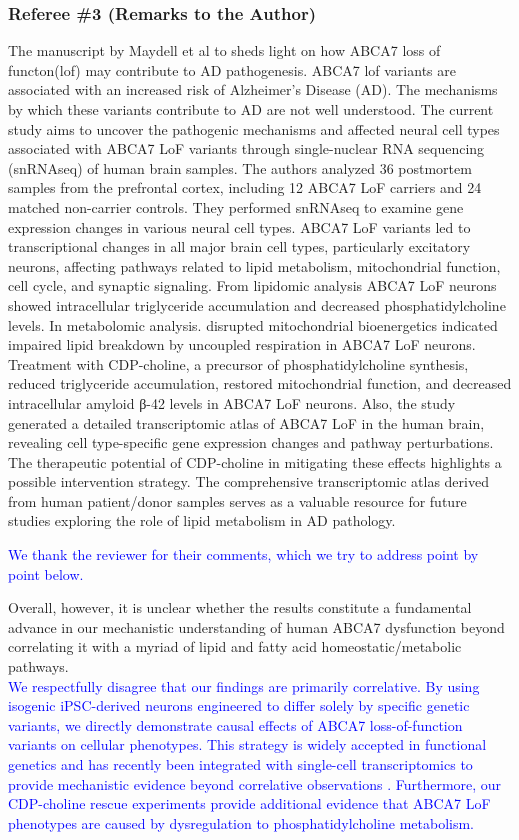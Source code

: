 \subsubsection{Referee \#3 (Remarks to the Author)}
The manuscript by Maydell et al to sheds light on how ABCA7 loss of functon(lof) may contribute to AD pathogenesis. ABCA7 lof variants are associated with an increased risk of Alzheimer's Disease (AD). The mechanisms by which these variants contribute to AD are not well understood. The current study aims to uncover the pathogenic mechanisms and affected neural cell types associated with ABCA7 LoF variants through single-nuclear RNA sequencing (snRNAseq) of human brain samples. The authors analyzed 36 postmortem samples from the prefrontal cortex, including 12 ABCA7 LoF carriers and 24 matched non-carrier controls. They performed snRNAseq to examine gene expression changes in various neural cell types. ABCA7 LoF variants led to transcriptional changes in all major brain cell types, particularly excitatory neurons, affecting pathways related to lipid metabolism, mitochondrial function, cell cycle, and synaptic signaling. From lipidomic analysis ABCA7 LoF neurons showed intracellular triglyceride accumulation and decreased phosphatidylcholine levels. In metabolomic analysis. disrupted mitochondrial bioenergetics indicated impaired lipid breakdown by uncoupled respiration in ABCA7 LoF neurons. Treatment with CDP-choline, a precursor of phosphatidylcholine synthesis, reduced triglyceride accumulation, restored mitochondrial function, and decreased intracellular amyloid β-42 levels in ABCA7 LoF neurons. Also, the study generated a detailed transcriptomic atlas of ABCA7 LoF in the human brain, revealing cell type-specific gene expression changes and pathway perturbations. The therapeutic potential of CDP-choline in mitigating these effects highlights a possible intervention strategy. The comprehensive transcriptomic atlas derived from human patient/donor samples serves as a valuable resource for future studies exploring the role of lipid metabolism in AD pathology.

\textcolor{blue}{We thank the reviewer for their comments, which we try to address point by point below.}

Overall, however, it is unclear whether the results constitute a fundamental advance in our mechanistic understanding of human ABCA7 dysfunction beyond correlating it with a myriad of lipid and fatty acid homeostatic/metabolic pathways.\\
\textcolor{blue}{We respectfully disagree that our findings are primarily correlative. By using isogenic iPSC-derived neurons engineered to differ solely by specific genetic variants, we directly demonstrate causal effects of ABCA7 loss-of-function variants on cellular phenotypes. This strategy is widely accepted in functional genetics and has recently been integrated with single-cell transcriptomics to provide mechanistic evidence beyond correlative observations \cite{Haney2024-bp,Sun2023-fo}. Furthermore, our CDP-choline rescue experiments provide additional evidence that ABCA7 LoF phenotypes are caused by dysregulation to phosphatidylcholine metabolism.}

